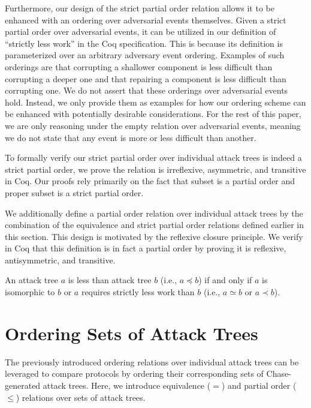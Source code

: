 \documentclass[runningheads]{llncs}
\theoremstyle{definition}
\begin{document}
Furthermore, our design of the strict partial order relation allows it to be enhanced with an ordering over adversarial events themselves. Given a strict partial order over adversarial events, it can be utilized in our definition of ``strictly less work'' in the Coq specification. This is because its definition is parameterized over an arbitrary adversary event ordering. Examples of such orderings are that corrupting a shallower component is less difficult than corrupting a deeper one and that repairing a component is less difficult than corrupting one. We do not assert that these orderings over adversarial events hold. Instead, we only provide them as examples for how our ordering scheme can be enhanced with potentially desirable considerations. For the rest of this paper, we are only reasoning under the empty relation over adversarial events, meaning we do not state that any event is more or less difficult than another.


To formally verify our strict partial order over individual attack trees is indeed a strict partial order, we prove the relation is irreflexive, asymmetric, and transitive in Coq. Our proofs rely primarily on the fact that subset is a partial order and proper subset is a strict partial order.

We additionally define a partial order relation over individual attack trees by the combination of the equivalence and strict partial order relations defined earlier in this section. This design is motivated by the reflexive closure principle. We verify in Coq that this definition is in fact a partial order by proving it is reflexive, antisymmetric, and transitive.

\begin{definition}
  An attack tree $a$ is less than attack tree $b$ (i.e., $a \preceq b$) if and only if $a$ is isomorphic to $b$ or $a$ requires strictly less work than $b$ (i.e., $a \simeq b$ or $a \prec b$).
\end{definition}


\section{Ordering Sets of Attack Trees}

The previously introduced ordering relations over individual attack trees can be leveraged to compare protocols by ordering their corresponding sets of Chase-generated attack trees. Here, we introduce equivalence ($=$) and partial order ($\le$) relations over sets of attack trees.
\end{document}
